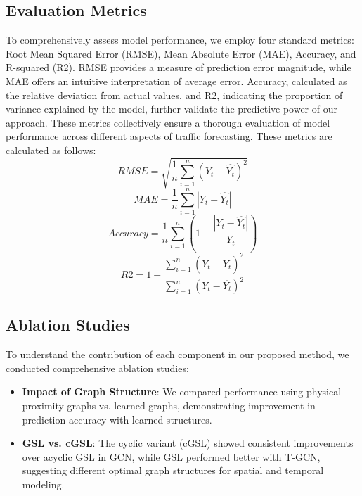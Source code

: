 \documentclass[pdflatex,sn-mathphys-num]{sn-jnl}%
\theoremstyle{thmstyleone}%
\theoremstyle{thmstyletwo}%
\theoremstyle{thmstylethree}%
\begin{document}
\subsection{Evaluation Metrics}
To comprehensively assess model performance, we employ four standard metrics: Root Mean Squared Error (RMSE), Mean Absolute Error (MAE), Accuracy, and R-squared (R2). RMSE provides a measure of prediction error magnitude, while MAE offers an intuitive interpretation of average error. Accuracy, calculated as the relative deviation from actual values, and R2, indicating the proportion of variance explained by the model, further validate the predictive power of our approach. These metrics collectively ensure a thorough evaluation of model performance across different aspects of traffic forecasting.
These metrics are calculated as follows:
\begin{equation}
RMSE=\sqrt{\frac{1}{n}\sum_{i=1}^{n}(Y_{t}-\widehat{Y_{t}})^{2}}
\end{equation}
\begin{equation}
MAE=\frac{1}{n}\sum_{i=1}^{n}|Y_{t}-\widehat{Y_{t}}|
\end{equation}
\begin{equation}
Accuracy=\frac{1}{n}\sum_{i=1}^{n}\left(1-\frac{|Y_{t}-\widehat{Y_{t}}|}{Y_{t}}\right)
\end{equation}
\begin{equation}
R2=1-\frac{\sum_{i=1}^{n}(Y_{t}-\widehat{Y_{t}})^{2}}{\sum_{i=1}^{n}(Y_{t}-\overline{Y_{t}})^{2}}
\end{equation}

\subsection{Ablation Studies}
To understand the contribution of each component in our proposed method, we conducted comprehensive ablation studies:

\begin{itemize}
\item \textbf{Impact of Graph Structure}: We compared performance using physical proximity graphs vs. learned graphs, demonstrating improvement in prediction accuracy with learned structures.

\item \textbf{GSL vs. cGSL}: The cyclic variant (cGSL) showed consistent improvements over acyclic GSL in GCN, while GSL performed better with T-GCN, suggesting different optimal graph structures for spatial and temporal modeling.

\end{itemize}
\end{document}
